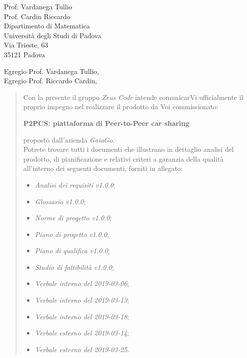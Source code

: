 \begin{letter}{
		Prof. Vardanega Tullio \\
		Prof. Cardin Riccardo \\
		Dipartimento di Matematica \\
		Università degli Studi di Padova \\
		Via Trieste, 63 \\
		35121 Padova}
		
\opening{Egregio Prof. Vardanega Tullio,\\Egregio Prof. Riccardo Cardin,}

\begin{quotation}
Con la presente il gruppo \textit{Zeus Code} intende comunicarVi ufficialmente il proprio impegno nel realizzare il prodotto da Voi 
commissionato:

\begin{center}
	\textbf{P2PCS: piattaforma di Peer-to-Peer car sharing}
\end{center}

\noindent proposto dall'azienda \textit{GaiaGo}.\\
Potrete trovare tutti i documenti che illustrano in dettaglio analisi del prodotto, di pianificazione e relativi criteri a garanzia della qualità all'interno dei seguenti 
documenti, forniti in allegato:

\begin{itemize}
	\item \textit{Analisi dei requisiti v1.0.0};
	
	\item \textit{Glossario v1.0.0};
	
	\item \textit{Norme di progetto v1.0.0};

	\item \textit{Piano di progetto v1.0.0};

	\item \textit{Piano di qualifica v1.0.0};

	\item \textit{Studio di fattibilità v1.0.0};

	\item \textit{Verbale interno del 2019-03-06};
	\item \textit{Verbale interno del 2019-03-13};
	\item \textit{Verbale interno del 2019-03-18};
	
	\item \textit{Verbale esterno del 2019-03-14};
	\item \textit{Verbale esterno del 2019-03-25}.
\end{itemize}


\end{quotation}
\end{letter}
